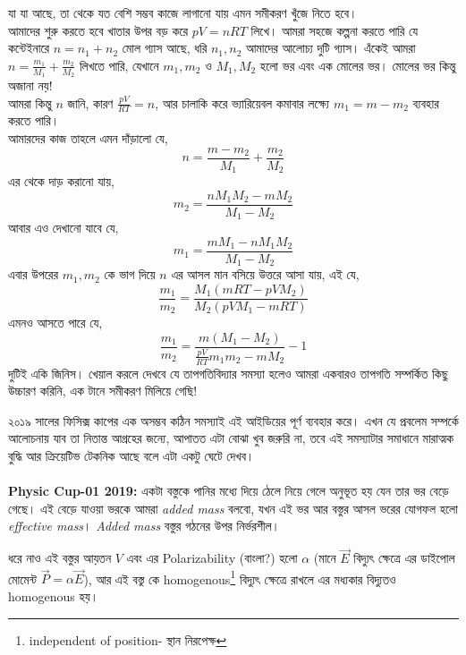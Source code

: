 \documentclass[12pt,a4paper]{article}
\begin{document}
যা যা আছে, তা থেকে যত বেশি সম্ভব কাজে লাগানো যায় এমন সমীকরণ খুঁজে নিতে হবে। \\  
আমাদের শুরু করতে হবে খাতার উপর বড় করে $pV = nRT$ লিখে। আমরা সহজে কল্পনা করতে পারি যে কন্টেইনারে $n = n_1 + n_2$ মোল গ্যাস আছে, ধরি $n_1,n_2$ আমাদের আলোচ্য দুটি গ্যাস। এঁকেই আমরা $ n = \frac{m_1}{M_1} + \frac{m_2}{M_2} $ লিখতে পারি, যেখানে $m_1,m_2$ ও $M_1,M_2$ হলো ভর এবং এক মোলের ভর। মোলের ভর কিন্তু অজানা নয়!\\
আমরা কিন্তু $n$ জানি, কারণ $\frac{pV}{RT} = n$, আর চালাকি করে ভ্যারিয়েবল কমাবার লক্ষ্যে $m_1 = m - m_2$ ব্যবহার করতে পারি। \\
আমারদের কাজ তাহলে এমন দাঁড়ালো যে, 
\[ n = \frac{m - m_2}{M_1} + \frac{m_2}{M_2} \]
এর থেকে দাড় করানো যায়,
\[ m_2 = \frac{nM_1M_2 - mM_2}{M_1 - M_2} \]
আবার এও দেখানো যাবে যে,
\[ m_1 = \frac{mM_1 - nM_1M_2}{M_1 - M_2} \]
এবার উপরের $m_1, m_2$ কে ভাগ দিয়ে $n$ এর আসল মান বসিয়ে উত্তরে আসা যায়, এই যে,
\[\frac{m_1}{m_2} = \frac{M_1 (mRT - pVM_2)}{M_2(pVM_1 - mRT)} \]
এমনও আসতে পারে যে, 
\[\frac{m_1}{m_2} = \frac{m(M_1 - M_2)}{\frac{pV}{RT}m_1m_2 - mM_2} - 1 \]
দুটিই একি জিনিস। খেয়াল করলে দেখবে যে তাপগতিবিদ্যার সমস্যা হলেও আমরা একবারও তাপগতি সম্পর্কিত কিছু উচ্চারণ করিনি, এক টানে সমীকরণ মিলিয়ে গেছি!

২০১৯ সালের ফিসিক্স কাপের এক অসম্ভব কঠিন সমস্যাই এই আইডিয়ের পূর্ণ ব্যবহার করে। এখন যে প্রবলেম সম্পর্কে আলোচনায় যাব তা নিতান্ত আগ্রহের জন্যে, আপাতত এটা বোঝা খুব জরুরি না, তবে এই সমস্যাটার সমাধানে মারাত্মক বুদ্ধি আর ক্রিয়েটিভ টেকনিক আছে বলে এটা একটু ঘেটে দেখব। \\
\\
\textbf{Physic Cup-01 2019:} একটা বস্তুকে পানির মধ্যে দিয়ে ঠেলে নিয়ে গেলে অনুভূত হয় যেন তার ভর বেড়ে গেছে। এই বেড়ে যাওয়া ভরকে আমরা \emph{added mass} বলবো, যখন এই ভর আর বস্তুর আসল ভরের যোগফল হলো \emph{effective mass}। \emph{Added mass} বস্তুর গঠনের উপর নির্ভরশীল। 

ধরে নাও এই বস্তুর আয়তন $V$ এবং এর Polarizability (বাংলা?) হলো $\alpha$ (মানে $\vec{E}$ বিদ্যুৎ ক্ষেত্রে এর ডাইপোল মোমেন্ট $\vec{P} = \alpha \vec{E}$), আর এই বস্তু কে homogenous\footnote{independent of position- স্থান নিরপেক্ষ} বিদ্যুৎ ক্ষেত্রে রাখলে এর মধ্যকার বিদ্যুতও homogenous হয়। 
\end{document}
